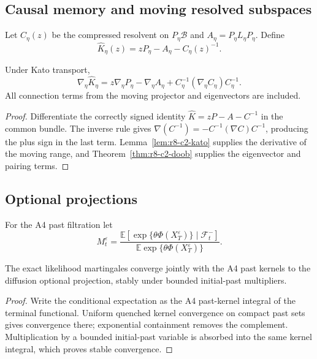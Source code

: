 \subsection{Causal memory and moving resolved subspaces}

Let $C_\eta(z)$ be the compressed resolvent on
$P_\eta\mathscr B$ and $A_\eta=P_\eta L_\eta P_\eta$.  Define
\[
 \widehat K_\eta(z)=zP_\eta-A_\eta-C_\eta(z)^{-1}.
\]

\begin{theorem}
\label{thm:r8-c2-memory}
Under Kato transport,
\[
 \nabla_\eta\widehat K_\eta
 =z\nabla_\eta P_\eta-
 \nabla_\eta A_\eta+
 C_\eta^{-1}(\nabla_\eta C_\eta)C_\eta^{-1}.
\]
All connection terms from the moving projector and eigenvectors are included.
\end{theorem}

\begin{proof}
Differentiate the correctly signed identity
$\widehat K=zP-A-C^{-1}$ in the common bundle.  The inverse rule gives
$\nabla(C^{-1})=-C^{-1}(\nabla C)C^{-1}$, producing the plus sign in the last
term.  Lemma~\ref{lem:r8-c2-kato} supplies the derivative of the moving range,
and Theorem~\ref{thm:r8-c2-doob} supplies the eigenvector and pairing terms.
\end{proof}

\subsection{Optional projections}

For the A4 past filtration let
\[
 M_t^\varepsilon=
 \frac{\mathbb E[\exp\{\theta\Phi(X_T^\varepsilon)\}
 \mid\mathcal F_t^-]}{
 \mathbb E\exp\{\theta\Phi(X_T^\varepsilon)\}}.
\]

\begin{theorem}
\label{thm:r8-c2-optional}
The exact likelihood martingales converge jointly with the A4 past kernels to
the diffusion optional projection, stably under bounded initial-past
multipliers.
\end{theorem}

\begin{proof}
Write the conditional expectation as the A4 past-kernel integral of the
terminal functional.  Uniform quenched kernel convergence on compact past sets
gives convergence there; exponential containment removes the complement.
Multiplication by a bounded initial-past variable is absorbed into the same
kernel integral, which proves stable convergence.
\end{proof}

